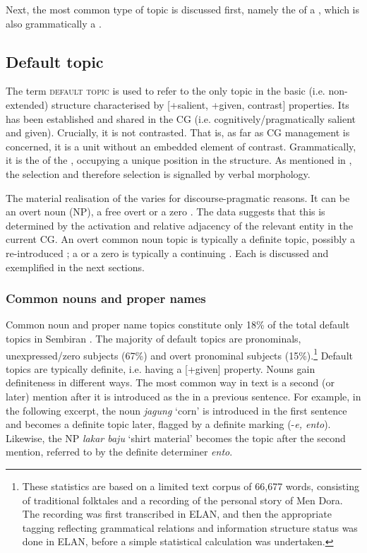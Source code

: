 \documentclass[output=paper
,modfonts
,nonflat]{langsci/langscibook}
\begin{document}
Next, the most common type of topic is discussed first, namely the  of a , which is also grammatically a .

\subsection{\label{s5.1}Default topic} 

The term \textsc{default topic} is used to refer to the only topic in the basic (i.e. non-extended)  structure characterised by [+salient, +given, \textminus contrast] properties. Its  has been established and shared in the CG (i.e. cognitively/pragmatically salient and given). Crucially, it is not contrasted. That is, as far as CG management is concerned, it is a unit without an embedded element of contrast. Grammatically, it is the  of the , occupying a unique  position in the  structure. As mentioned in , the  selection and therefore  selection is signalled by verbal  morphology.

The material realisation of the  varies for discourse-pragmatic reasons. It can be an overt noun (NP), a free overt  or a zero . The data suggests that this is determined by the activation and relative adjacency of the relevant entity in the current CG. An overt common noun topic is typically a definite topic, possibly a re-introduced ; a  or a zero  is typically a continuing . Each is discussed and exemplified in the next sections.

\subsubsection{{Common nouns and proper names}}

Common noun and proper name topics constitute only 18\% of the total default topics in Sembiran . The majority of default topics are pronominals, unexpressed/zero subjects (67\%) and overt pronominal subjects (15\%).\footnote{These statistics are based on a limited text corpus of 66,677 words, consisting of traditional folktales and a recording of the personal story of Men Dora.  The recording was first transcribed in ELAN, and then the appropriate tagging reflecting grammatical relations and information structure status was done in ELAN, before a simple statistical calculation was undertaken.}  Default topics are typically definite, i.e. having a [+given] property. Nouns gain definiteness in different ways. The most common way in text is a second (or later) mention after it is introduced as the  in a previous sentence.  For example, in the following excerpt, the noun \textit{jagung} ‘corn’ is introduced in the first sentence and becomes a definite topic later, flagged by a definite marking (-\textit{e, ento}). Likewise, the NP \textit{lakar baju} ‘shirt material’ becomes the topic after the second mention, referred to by the definite determiner \textit{ento}. 
\end{document}
